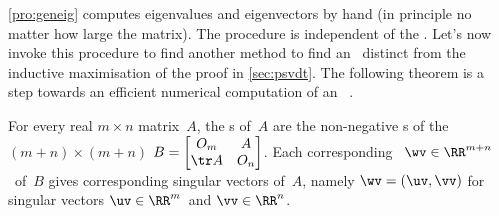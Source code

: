 \autoref{pro:geneig} computes eigenvalues and eigenvectors by hand (in principle no matter how large the matrix). 
The procedure is independent of the \svd.
Let's now invoke this procedure to find another method to find an \svd\ distinct from the inductive maximisation of the proof in \autoref{sec:psvdt}. 
The following theorem is a step towards an efficient numerical computation of an \svd\ \cite[p.234]{Trefethen1997}.



\begin{theorem} \label{thm:eigsvd}
For every real \(m\times n\) matrix~\(A\), the s of~\(A\) are the non-negative s of the \((m+n)\times(m+n)\)  \(B=\begin{bmatrix} O_m&A\\\tr A&O_n \end{bmatrix}\). 
Each corresponding ~\(\wv\in\RR^{m+n}\)\ of~\(B\) gives corresponding  singular vectors of~\(A\), namely \(\wv=(\uv,\vv)\) for singular vectors \(\uv\in\RR^m\)\ and \(\vv\in\RR^n\). 
\end{theorem}

